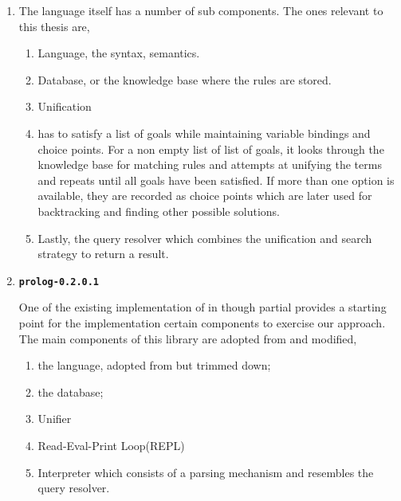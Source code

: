 \documentclass[thesis-solanki.tex]{subfiles}
\providecommand\codeLibrary[1]{\texttt{\bfseries #1}}
\begin{document}
\begin{enumerate}
\item {}

The language itself has a number of sub components.
The ones relevant to this thesis are,
\begin{enumerate}
\item Language, the syntax, semantics.

\item Database, or the knowledge base where the rules are stored.

\item Unification

\item
   has to satisfy a list of goals while maintaining variable bindings and choice points.
  For a non empty list of list of goals, it looks through the knowledge base for matching rules and attempts at
  unifying the terms and repeats until all goals have been satisfied.
  If more than one option is available, they are recorded as choice points which are later used for backtracking
  and finding other possible solutions.

\item
  Lastly, the query resolver which combines the unification and search strategy to return a result.
\end{enumerate}

\item \codeLibrary{prolog-0.2.0.1} \cite{prolog-lib}

  One of the existing implementation of  in \yyy{}{\Large,} though partial\yyy{}{\Large,} provides a starting
  point for the implementation 
  certain components to exercise
  our approach.
  The main components of this library are adopted from  and modified,

\begin{enumerate}
\item the language, adopted from  but trimmed down;

\item the database;

\item Unifier

\item Read-Eval-Print Loop(REPL)

\item Interpreter which consists of a parsing mechanism and resembles the query resolver.
\end{enumerate}


\end{enumerate}
\end{document}
